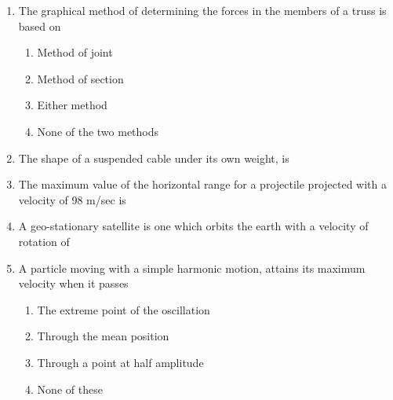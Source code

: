 \documentclass[11pt,a4paper]{article}
\begin{document}
\begin{enumerate}
\item{The graphical method of determining the forces in the members of a truss is based on}
\begin{enumerate}[label=\Alph*.]
\item{Method of joint}
\item{Method of section}
\item{Either method}
\item{None of the two methods}
\end{enumerate}
\item{The shape of a suspended cable under its own weight, is}
\\
\item{The maximum value of the horizontal range for a projectile projected with a velocity of 98 m/sec is}
\\
\item{A geo-stationary satellite is one which orbits the earth with a velocity of rotation of}
\\
\item{A particle moving with a simple harmonic motion, attains its maximum velocity when it passes}
\begin{enumerate}[label=\Alph*.]
\item{The extreme point of the oscillation}
\item{Through the mean position}
\item{Through a point at half amplitude}
\item{None of these}

\end{enumerate}
\end{enumerate}
\end{document}
